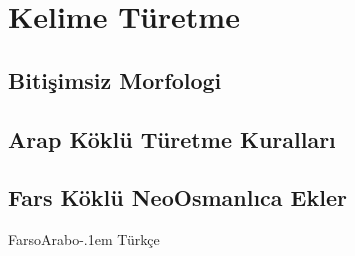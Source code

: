 \documentclass[a5paper,12pt]{scrbook}
\newcommand{\fat}{FarsoArabo\kern -.1em Türkçe}
\begin{document}
\chapter{Kelime Türetme}
\section{Bitişimsiz Morfologi}

\section{Arap Köklü Türetme Kuralları}

\section{Fars Köklü NeoOsmanlıca Ekler}
\fat
\end{document}
